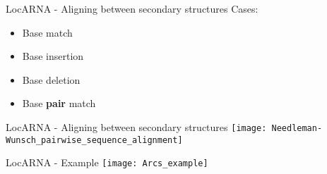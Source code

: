 \begin{frame}[c]{LocARNA - Aligning between secondary structures}
    \Large
    Cases:
    \begin{itemize}[<+(1)->]
    \item Base match
    \item Base insertion
    \item Base deletion
    \item Base \textbf{pair} match
    \end{itemize}
\end{frame}



\begin{frame}[c]{LocARNA - Aligning between secondary structures}
    \center
    \texttt{[image: Needleman-Wunsch\_pairwise\_sequence\_alignment]}
\end{frame}


\begin{frame}[c]{LocARNA - Example}
    \center
    \texttt{[image: Arcs\_example]}
\end{frame}






